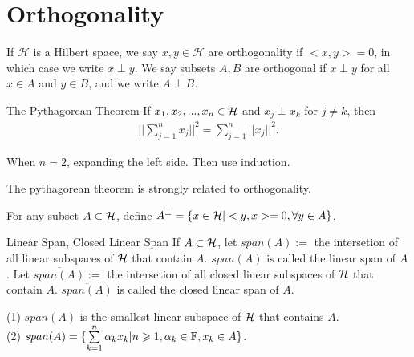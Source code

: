 \chapter{Orthogonality}\label{chp:1_2}


\begin{definition}{}{}
    If $\mathcal{H}$ is a Hilbert space, we say $x,y\in \mathcal{H}$ are orthogonality if $<x,y>=0$, 
    in which case we write $x\perp y$.  We say subsets $A,B$ are orthogonal if $x\perp y$ 
    for all $x\in A$ and $y\in B$, and we write $A\perp B$. 
\end{definition}

\begin{theorem}{The Pythagorean Theorem}{}
    If $x_1,x_2,...,x_n\in\mathcal{H}$ and $x_j\perp x_k$ for $j\neq k$, then
    \begin{align*}
        ||\sum\limits_{j=1}^{n}x_j||^2=\sum\limits_{j=1}^{n}||x_j||^2.
    \end{align*}
\end{theorem}
\begin{proofsolution}
    When $n=2$, expanding the left side.
    Then use induction.
\end{proofsolution}

\begin{remark}
    The pythagorean theorem is strongly related to orthogonality.
\end{remark}


\begin{definition}{}{}
    For any subset $A\subset \mathcal{H}$, define $A^{\perp}=\{x\in \mathcal{H}|<y,x>=0,\forall y\in A\}$.  
\end{definition}


\begin{definition}{Linear Span, Closed Linear Span}{}
    If $A\subset \mathcal{H}$, let $span(A):=$ the intersetion of all linear subspaces of $\mathcal{H}$ that contain $A$.
    $span(A)$ is called the linear span of $A$.
    Let $\overline{span(A)}:=$ the intersetion of all closed linear subspaces of $\mathcal{H}$ that contain $A$.
    $\overline{span(A)}$ is called the closed linear span of $A$.
\end{definition}

\begin{proposition}{}{}
    (1) $span(A)$ is the smallest linear subspace of $\mathcal{H}$ that contains $A$.\\
    (2) $span(A)=\{\sum\limits_{k=1}^{n}\alpha_kx_k|n\geqslant 1,\alpha_k\in \mathbb{F},x_k\in A\}$.
\end{proposition}

